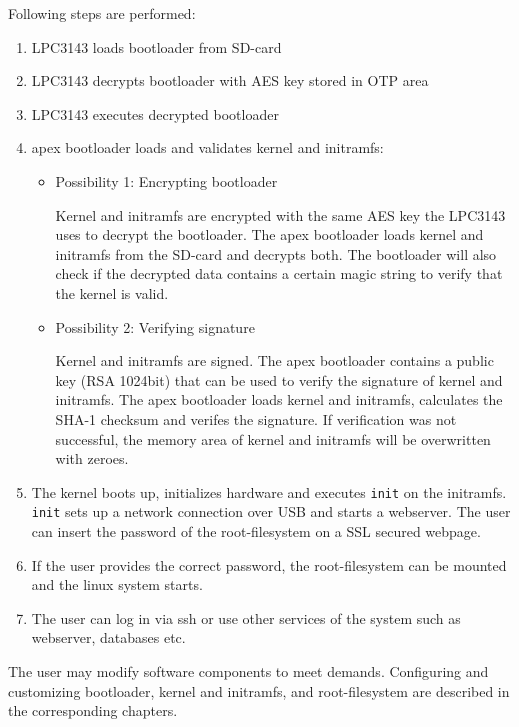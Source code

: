 Following steps are performed:
\begin{enumerate}
\item LPC3143 loads bootloader from SD-card
\item LPC3143 decrypts bootloader with AES key stored in OTP area
\item LPC3143 executes decrypted bootloader
\item apex bootloader loads and validates kernel and initramfs:
  \begin{itemize}
  \item Possibility 1: Encrypting bootloader

  Kernel and initramfs are encrypted with the same AES key the LPC3143 uses to
  decrypt the bootloader. The apex bootloader loads kernel and initramfs from
  the SD-card and decrypts both. The bootloader will also check if the decrypted
  data contains a certain magic string to verify that the kernel is valid.

  \item Possibility 2: Verifying signature

  Kernel and initramfs are signed. The apex bootloader contains a public key
  (RSA 1024bit) that can be used to verify the signature of kernel and
  initramfs. The apex bootloader loads kernel and initramfs, calculates the
  SHA-1 checksum and verifes the signature. If verification was not successful,
  the memory area of kernel and initramfs will be overwritten with zeroes.
  \end{itemize}
\item The kernel boots up, initializes hardware and executes \texttt{init} on the
initramfs. \texttt{init} sets up a network connection over USB and starts a webserver. The user can insert the
password of the root-filesystem on a SSL secured webpage.
\item If the user provides the correct password, the root-filesystem can be mounted and the linux system starts.
\item The user can log in via ssh or use other services of the system such as webserver, databases etc.
\end{enumerate}

The user may modify software components to meet demands. Configuring and
customizing bootloader, kernel and initramfs, and root-filesystem are described
in the corresponding chapters.


